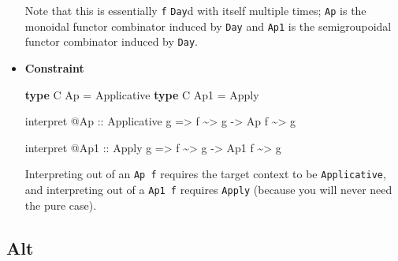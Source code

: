 \documentclass[]{article}
\newenvironment{Shaded}{}{}
\newcommand{\DataTypeTok}[1]{\textcolor[rgb]{0.56,0.13,0.00}{#1}}
\newcommand{\KeywordTok}[1]{\textcolor[rgb]{0.00,0.44,0.13}{\textbf{#1}}}
\newcommand{\NormalTok}[1]{#1}
\newcommand{\OperatorTok}[1]{\textcolor[rgb]{0.40,0.40,0.40}{#1}}
\newcommand{\OtherTok}[1]{\textcolor[rgb]{0.00,0.44,0.13}{#1}}
\begin{document}
\begin{itemize}
  Note that this is essentially \texttt{f} \texttt{Day}d with itself multiple
  times; \texttt{Ap} is the monoidal functor combinator induced by \texttt{Day}
  and \texttt{Ap1} is the semigroupoidal functor combinator induced by
  \texttt{Day}.
\item
  \textbf{Constraint}

\begin{Shaded}
\begin{Highlighting}[]
\KeywordTok{type} \DataTypeTok{C} \DataTypeTok{Ap}  \OtherTok{=} \DataTypeTok{Applicative}
\KeywordTok{type} \DataTypeTok{C} \DataTypeTok{Ap1} \OtherTok{=} \DataTypeTok{Apply}

\NormalTok{interpret }\OperatorTok{@}\DataTypeTok{Ap}
\OtherTok{    ::} \DataTypeTok{Applicative}\NormalTok{ g}
    \OtherTok{=>}\NormalTok{ f }\OperatorTok{\textasciitilde{}>}\NormalTok{ g}
    \OtherTok{{-}>} \DataTypeTok{Ap}\NormalTok{ f }\OperatorTok{\textasciitilde{}>}\NormalTok{ g}

\NormalTok{interpret }\OperatorTok{@}\DataTypeTok{Ap1}
\OtherTok{    ::} \DataTypeTok{Apply}\NormalTok{ g}
    \OtherTok{=>}\NormalTok{ f }\OperatorTok{\textasciitilde{}>}\NormalTok{ g}
    \OtherTok{{-}>} \DataTypeTok{Ap1}\NormalTok{ f }\OperatorTok{\textasciitilde{}>}\NormalTok{ g}
\end{Highlighting}
\end{Shaded}

  Interpreting out of an \texttt{Ap\ f} requires the target context to be
  \texttt{Applicative}, and interpreting out of a \texttt{Ap1\ f} requires
  \texttt{Apply} (because you will never need the pure case).
\end{itemize}

\hypertarget{alt}{%
\subsection{Alt}\label{alt}}
\end{document}
